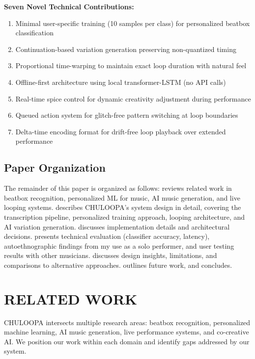 \documentclass{aimc2026}
\begin{document}
\textbf{Seven Novel Technical Contributions:}

\begin{enumerate}
\item Minimal user-specific training (10 samples per class) for personalized beatbox classification
\item Continuation-based variation generation preserving non-quantized timing
\item Proportional time-warping to maintain exact loop duration with natural feel
\item Offline-first architecture using local transformer-LSTM (no API calls)
\item Real-time spice control for dynamic creativity adjustment during performance
\item Queued action system for glitch-free pattern switching at loop boundaries
\item Delta-time encoding format for drift-free loop playback over extended performance
\end{enumerate}

\subsection{Paper Organization}

The remainder of this paper is organized as follows:  reviews related work in beatbox recognition, personalized ML for music, AI music generation, and live looping systems.  describes CHULOOPA's system design in detail, covering the transcription pipeline, personalized training approach, looping architecture, and AI variation generation.  discusses implementation details and architectural decisions.  presents technical evaluation (classifier accuracy, latency), autoethnographic findings from my use as a solo performer, and user testing results with other musicians.  discusses design insights, limitations, and comparisons to alternative approaches.  outlines future work, and  concludes.


\section{RELATED WORK}
\label{sec:related_work}

CHULOOPA intersects multiple research areas: beatbox recognition, personalized machine learning, AI music generation, live performance systems, and co-creative AI. We position our work within each domain and identify gaps addressed by our system.
\end{document}
